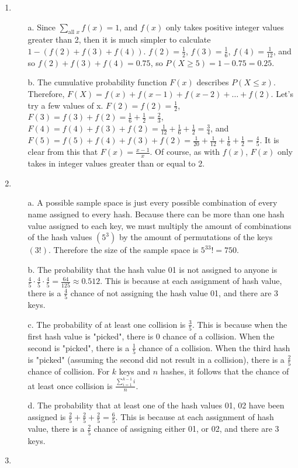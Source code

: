 \documentclass[10pt,english]{article}
\begin{document}
\begin{enumerate}
\item\begin{enumerate}
    \item [a.] Since $\sum_{\text{all }x}f(x)=1$, and $f(x)$ only takes positive integer values greater than 2, then it is much simpler to calculate $1-(f(2)+f(3)+f(4))$. $f(2)=\frac{1}{2}$, $f(3)=\frac{1}{6}$, $f(4)=\frac{1}{12}$, and so $f(2)+f(3)+f(4)=0.75$, so $P(X\geq5)=1-0.75=0.25$. 
    \item [b.] The cumulative probability function $F(x)$ describes $P(X\leq x)$. Therefore, $F(X)=f(x)+f(x-1)+f(x-2)+\ldots+f(2)$. Let's try a few values of x. $F(2)=f(2)=\frac{1}{2}$, $F(3)=f(3)+f(2)=\frac{1}{6}+\frac{1}{2}=\frac{2}{3}$, $F(4)=f(4)+f(3)+f(2)=\frac{1}{12}+\frac{1}{6}+\frac{1}{2}=\frac{3}{4}$, and $F(5)=f(5)+f(4)+f(3)+f(2)=\frac{1}{20}+\frac{1}{12}+\frac{1}{6}+\frac{1}{2}=\frac{4}{5}$. It is clear from this that $F(x)=\frac{x-1}{x}$. Of course, as with $f(x)$, $F(x)$ only takes in integer values greater than or equal to 2.
\end{enumerate}

\pagebreak

\item\begin{enumerate}
    \item [a.] A possible sample space is just every possible combination of every name assigned to every hash. Because there can be more than one hash value assigned to each key, we must multiply the amount of combinations of the hash values $(5^3)$ by the amount of permutations of the keys $(3!)$. Therefore the size of the sample space is $5^33!=750$.
    \item [b.] The probability that the hash value 01 is not assigned to anyone is $\frac{4}{5}\cdot\frac{4}{5}\cdot\frac{4}{5}=\frac{64}{125}\approx0.512$. This is because at each assignment of hash value, there is a $\frac{4}{5}$ chance of not assigning the hash value 01, and there are 3 keys. 
    \item [c.] The probability of at least one collision is $\frac{3}{5}$. This is because when the first hash value is "picked", there is 0 chance of a collision. When the second is "picked", there is a $\frac{1}{5}$ chance of a collision. When the third hash is "picked" (assuming the second did not result in a collision), there is a $\frac{2}{5}$ chance of collision. For $k$ keys and $n$ hashes, it follows that the chance of at least once collision is $\frac{\sum_{i=1}^{k-1}i}{n}$.
    \item [d.] The probability that at least one of the hash values 01, 02 have been assigned is $\frac{2}{5}+\frac{2}{5}+\frac{2}{5}=\frac{6}{5}$. This is because at each assignment of hash value, there is a $\frac{2}{5}$ chance of assigning either 01, or 02, and there are 3 keys.
\end{enumerate}

\pagebreak

\item 
\end{enumerate}
\end{document}
